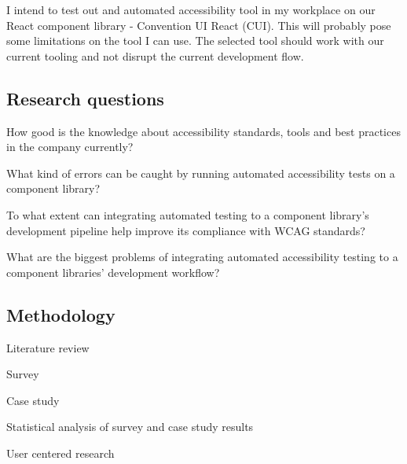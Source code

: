 \documentclass{master_thesis}
\begin{document}
I intend to test out and automated accessibility tool in my workplace on our React component library - Convention UI React (CUI). This will probably pose some limitations on the tool I can use. The selected tool should work with our current tooling and not disrupt the current development flow.

\subsection{Research questions}

	\begin{RQlist}
		\item How good is the knowledge about accessibility standards, tools and best practices in the company currently?
		\item What kind of errors can be caught by running automated accessibility tests on a component library?
		\item To what extent can integrating automated testing to a component library's development pipeline help improve its compliance with WCAG standards?
		\item What are the biggest problems of integrating automated accessibility testing to a component libraries' development workflow?
	\end{RQlist}

\subsection{Methodology}


\begin{list}{-}{}
	\item Literature review
	\item Survey
	\item Case study
	\item Statistical analysis of survey and case study results
	\item User centered research
\end{list}
\end{document}
